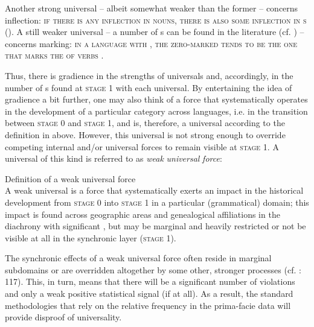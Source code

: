 \documentclass[output=paper]{langsci/langscibook}
\begin{document}
Another strong universal – albeit somewhat weaker than the former – concerns inflection: \textsc{if there is any inflection in nouns, there is also some inflection in s} (\citealt{Moravcsik1993_Gov,Plank2002ff_Univ}). A still weaker universal – a number of s can be found in the literature (cf. \citealt{Handschuh2014_S}) – concerns  marking: \textsc{in a language with , the zero-marked  tends to be the one that marks the  of  verbs} \citep[95]{Greenberg1963}. 

Thus, there is gradience in the strengths of universals and, accordingly, in the number of s found at \textsc{stage 1} with each universal. By entertaining the idea of gradience a bit further, one may also think of a force that systematically operates in the development of a particular category across languages, i.e. in the transition between \textsc{stage} 0 and \textsc{stage} 1, and is, therefore, a universal according to the definition in  above. However, this universal is not strong enough to override competing internal and/or universal forces to remain visible at \textsc{stage} 1. A universal of this kind is referred to as \textit{weak} \textit{universal} \textit{force}\textsc{:} 

\eanoraggedright\label{ex:serzant:2}
Definition of a weak universal force\\
A weak universal is a force that systematically exerts an impact in the historical development from \textsc{stage 0} into \textsc{stage 1} in a particular (grammatical) domain; this impact is found across geographic areas and genealogical affiliations in the diachrony with significant , but may be marginal and heavily restricted or not be visible at all in the synchronic layer (\textsc{stage 1}).
\z

The synchronic effects of a weak universal force often reside in marginal subdomains or are overridden altogether by some other, stronger processes (cf. \citealt{Bickel2014}: 117). This, in turn, means that there will be a significant number of violations and only a weak positive statistical signal (if at all). As a result, the standard methodologies that rely on the relative frequency in the prima-facie data will provide disproof of universality. 
\end{document}
